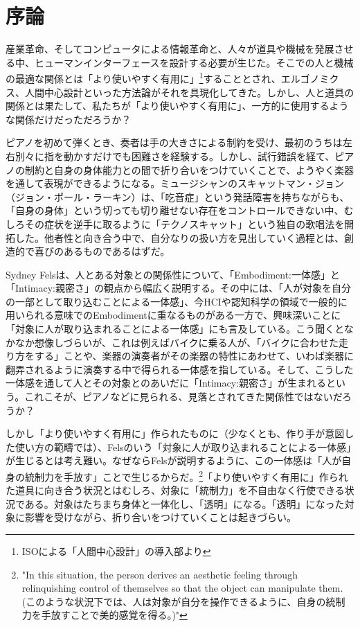 \chapter*{序論}

産業革命、そしてコンピュータによる情報革命と、人々が道具や機械を発展させる中、ヒューマンインターフェースを設計する必要が生じた。そこでの人と機械の最適な関係とは「より使いやすく有用に」\footnote{ISOによる「人間中心設計」の導入部\cite{hcd}より}することとされ、エルゴノミクス、人間中心設計といった方法論がそれを具現化してきた。しかし、人と道具の関係とは果たして、私たちが「より使いやすく有用に」、一方的に使用するような関係だけだっただろうか？

ピアノを初めて弾くとき、奏者は手の大きさによる制約を受け、最初のうちは左右別々に指を動かすだけでも困難さを経験する。しかし、試行錯誤を経て、ピアノの制約と自身の身体能力との間で折り合いをつけていくことで、ようやく楽器を通して表現ができるようになる。ミュージシャンのスキャットマン・ジョン（ジョン・ポール・ラーキン）は、「吃音症」という発話障害を持ちながらも、「自身の身体」という切っても切り離せない存在をコントロールできない中、むしろその症状を逆手に取るように「テクノスキャット」という独自の歌唱法を開拓した。他者性と向き合う中で、自分なりの扱い方を見出していく過程とは、創造的で喜びのあるものであるはずだ。

Sydney Felsは、人とある対象との関係性について、「Embodiment:一体感」と「Intimacy:親密さ」の観点から幅広く説明する。その中には、「人が対象を自分の一部として取り込むことによる一体感」、今HCIや認知科学の領域で一般的に用いられる意味でのEmbodimentに重なるものがある一方で、興味深いことに「対象に人が取り込まれることによる一体感」にも言及している。こう聞くとなかなか想像しづらいが、これは例えばバイクに乗る人が、「バイクに合わせた走り方をする」ことや、楽器の演奏者がその楽器の特性にあわせて、いわば楽器に翻弄されるように演奏する中で得られる一体感を指している。そして、こうした一体感を通して人とその対象とのあいだに「Intimacy:親密さ」が生まれるという。これこそが、ピアノなどに見られる、見落とされてきた関係性ではないだろうか？

しかし「より使いやすく有用に」作られたものに（少なくとも、作り手が意図した使い方の範疇では）、Felsのいう「対象に人が取り込まれることによる一体感」が生じるとは考え難い。なぜならFelsが説明するように、この一体感は「人が自身の統制力を手放す」ことで生じるからだ。\footnote{"In this situation, the person derives an aesthetic feeling through relinquishing control of themselves so that the object can manipulate them.(このような状況下では、人は対象が自分を操作できるように、自身の統制力を手放すことで美的感覚を得る。)"}「より使いやすく有用に」作られた道具に向き合う状況とはむしろ、対象に「統制力」を不自由なく行使できる状況である。対象はたちまち身体と一体化し、「透明」になる。「透明」になった対象に影響を受けながら、折り合いをつけていくことは起きづらい。

